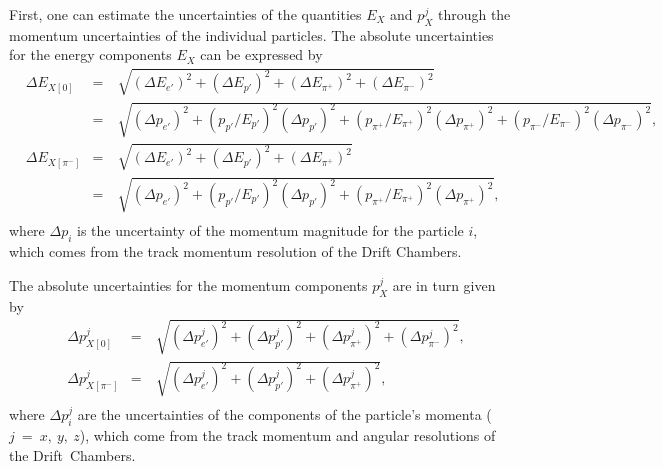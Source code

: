 First, one can estimate the uncertainties of the quantities $E_{X}$ and $p_{X}^{j}$ through the momentum uncertainties of the individual particles. 
The absolute uncertainties for the energy components $E_{X}$ can be expressed by
\begin{equation}
\begin{aligned}
&\Delta E_{X[0]} &=&~\sqrt{ \left ( \Delta E_{e'} \right )^{2} + \left ( \Delta E_{p'} \right )^{2} +  \left ( \Delta E_{\pi^{+}} \right )^{2} + \left ( \Delta E_{\pi^{-}} \right )^{2}} \\
&&=&~\sqrt{\left ( \Delta p_{e'} \right )^{2} + \left (p_{p'}/E_{p'}\right )^{2} \left (\Delta p_{p'} \right )^{2} +  \left (p_{\pi^{+}}/E_{\pi^{+}}\right )^{2} \left (\Delta p_{\pi^{+}} \right )^{2}+\left (p_{\pi^{-}}/E_{\pi^{-}}\right )^{2} \left (\Delta p_{\pi^{-}} \right )^{2}}, \\[10pt]
&\Delta E_{X[\pi^{-}]} &=&~\sqrt{ \left ( \Delta E_{e'} \right )^{2} + \left ( \Delta E_{p'} \right )^{2} + \left ( \Delta E_{\pi^{+}} \right )^{2}}\\
&&=&~\sqrt{\left ( \Delta p_{e'} \right )^{2} + \left (p_{p'}/E_{p'}\right )^{2} \left (\Delta p_{p'} \right )^{2} +  \left (p_{\pi^{+}}/E_{\pi^{+}}\right )^{2} \left (\Delta p_{\pi^{+}} \right )^{2}},\\
\end{aligned}\label{eq:res}
\end{equation}
where $\Delta p_{i}$ is the uncertainty of the momentum magnitude for the particle $i$, which comes from the track momentum resolution of the Drift Chambers.

The absolute uncertainties for the momentum components $p_{X}^{j}$ are in turn given by
\begin{equation}
\begin{aligned}
&\Delta p_{X[0]}^{j} &=&~\sqrt{ \left ( \Delta p_{e'}^{j} \right )^{2} + \left ( \Delta p_{p'}^{j} \right )^{2} +  \left ( \Delta p_{\pi^{+}}^{j} \right )^{2} + \left ( \Delta p_{\pi^{-}}^{j} \right )^{2}}, \\
&\Delta p_{X[\pi^{-}]}^{j} &=&~\sqrt{ \left ( \Delta p_{e'}^{j} \right )^{2} + \left ( \Delta p_{p'}^{j} \right )^{2} +  \left ( \Delta p_{\pi^{+}}^{j} \right )^{2}},\\
\end{aligned}\label{eq:res2}
\end{equation}
where $\Delta p_{i}^{j}$ are the uncertainties of the components of the particle's momenta ($j~=~x,~y,~z$), which come from the track momentum and angular resolutions of the Drift~Chambers.


